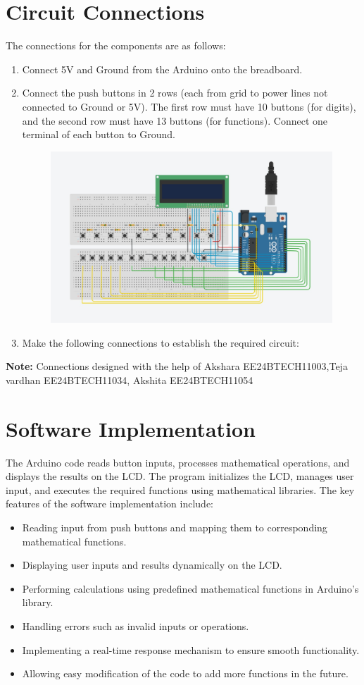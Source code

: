 \documentclass[12pt,a4paper]{article}
\begin{document}
\section{Circuit Connections}
The connections for the components are as follows:
\begin{enumerate}
    \item Connect 5V and Ground from the Arduino onto the breadboard.
    \item Connect the push buttons in 2 rows (each from grid to power lines not connected to Ground or 5V). The first row must have 10 buttons (for digits), and the second row must have 13 buttons (for functions). Connect one terminal of each button to Ground.
    \begin{figure}
    \centering
    \includegraphics[width=\textwidth]{figs/image.jpeg}
        \label{fig:yourlabel}
\end{figure}
    \item Make the following connections to establish the required circuit:
    
     \newpage
\end{enumerate}
\textbf{Note:} Connections designed with the help of Akshara EE24BTECH11003,Teja vardhan EE24BTECH11034, Akshita EE24BTECH11054
\section{Software Implementation}
The Arduino code reads button inputs, processes mathematical operations, and displays the results on the LCD. The program initializes the LCD, manages user input, and executes the required functions using mathematical libraries. The key features of the software implementation include:
\begin{itemize}
\item Reading input from push buttons and mapping them to corresponding mathematical functions.
\item Displaying user inputs and results dynamically on the LCD.
\item Performing calculations using predefined mathematical functions in Arduino's library.
\item Handling errors such as invalid inputs or operations.
\item Implementing a real-time response mechanism to ensure smooth functionality.
\item Allowing easy modification of the code to add more functions in the future.
\end{itemize}
\end{document}
